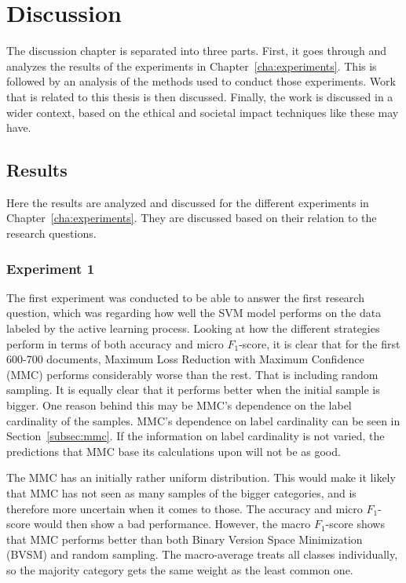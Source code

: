 \chapter{Discussion}
\label{cha:discussion}

The discussion chapter is separated into three parts.
First, it goes through and analyzes the results of the experiments in Chapter~\ref{cha:experiments}.
This is followed by an analysis of the methods used to conduct those experiments.
Work that is related to this thesis is then discussed.
Finally, the work is discussed in a wider context, based on the ethical and societal impact techniques like these may have.

\section{Results}
\label{sec:discussion-results}

Here the results are analyzed and discussed for the different experiments in Chapter~\ref{cha:experiments}.
They are discussed based on their relation to the research questions.

\subsection{Experiment 1}

The first experiment was conducted to be able to answer the first research question, which was regarding how well the SVM model performs on the data labeled by the active learning process.
Looking at how the different strategies perform in terms of both accuracy and micro $F_1$-score, it is clear that for the first 600-700 documents, Maximum Loss Reduction with Maximum Confidence (MMC) performs considerably worse than the rest.
That is including random sampling.
It is equally clear that it performs better when the initial sample is bigger.
One reason behind this may be MMC's dependence on the label cardinality of the samples.
MMC's dependence on label cardinality can be seen in Section~\ref{subsec:mmc}.
If the information on label cardinality is not varied, the predictions that MMC base its calculations upon will not be as good.

The MMC has an initially rather uniform distribution.
This would make it likely that MMC has not seen as many samples of the bigger categories, and is therefore more uncertain when it comes to those.
The accuracy and micro $F_1$-score would then show a bad performance.
However, the macro $F_1$-score shows that MMC performs better than both Binary Version Space Minimization (BVSM) and random sampling.
The macro-average treats all classes individually, so the majority category gets the same weight as the least common one.

